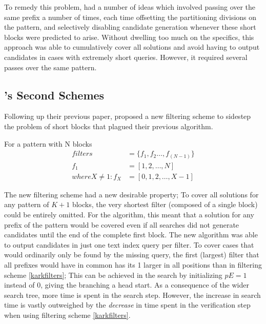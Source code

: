 {To remedy this problem, \vali{} had a number of ideas which involved passing over the same prefix a number of times, each time offsetting the partitioning divisions on the pattern, and selectively disabling candidate generation whenever these short blocks were predicted to arise. Without dwelling too much on the specifics, this approach was able to cumulatively cover all \glspl{solution} and avoid having to output candidates in cases with extremely short queries. However, it required several passes over the same pattern.





\subsection{\vali{}'s Second Schemes}

\label{schemes:vali2}
Following up their previous paper, \vali{} proposed a new \gls{filtering scheme} to sidestep the problem of short \glspl{block} that plagued their previous algorithm.
 
\begin{fscheme}
\textup{For a pattern with N blocks}
\label{valifilters}
\begin{align*}
filters &= \{f_1, f_2\ldots{}, f_{(N-1)}\}\\
f_1 &= [1, 2,\ldots , N]\\
where\phantom{ }X \neq 1 : f_X &= [0, 1, 2,\ldots, X-1]
\end{align*}
\end{fscheme}

\noindent
The new filtering scheme had a new desirable property; To cover all \glspl{solution} for any \gls{pattern} of $K+1$ blocks, the very shortest \gls{filter} (composed of a single block) could be entirely omitted. For the algorithm, this meant that a solution for any prefix of the pattern would be covered even if all searches did not generate \glspl{candidate} until the end of the complete first block. The new algorithm was able to output candidates in just one \gls{text index} \gls{query} per filter. To cover cases that would ordinarily only be found by the missing \gls{query}, the first (largest) \gls{filter} that all prefixes would have in common has its  1 larger in all positions than in filtering scheme \ref{karkfilters}; This can be achieved in the search by initializing $\textit{pE} = 1$ instead of 0, giving the branching a head start. As a consequence of the wider search tree, more time is spent in the \gls{search step}. However, the increase in search time is vastly outweighed by the \textit{decrease} in time spent in the \gls{verification step} when using filtering scheme \ref{karkfilters}.






}
